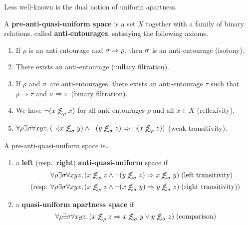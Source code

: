 \documentclass{article}
\def\oapt{\mathrel{\!\not\,\not\lesssim}}
\def\aent#1{\oapt_{#1}}
\let\implies\Rightarrow
\begin{document}
Less well-known is the dual notion of uniform apartness.

\begin{defn}
  A \textbf{pre-anti-quasi-uniform space} is a set $X$ together with a family of binary relations, called \textbf{anti-entourages}, satisfying the following axioms.
  \begin{enumerate}
  \item If $\rho$ is an anti-entourage and $\si\implies\rho$, then $\sigma$ is an anti-entourage (isotony).
  \item There exists an anti-entourage (nullary filtration).
  \item If $\rho$ and $\sigma$ are anti-entourages, there exists an anti-entourage $\tau$ such that $\rho\implies\tau$ and $\si\implies\tau$ (binary filtration).
  \item We have $\neg(x\aent\rho x)$ for all anti-entourages $\rho$ and all $x\in X$ (reflexivity).
  \item $\forall \rho \exists \si \forall xyz, (\neg(x\aent\si y) \land \neg(y\aent\si z) \implies \neg(x\aent\rho z))$ (weak transitivity).
  \end{enumerate}
  A pre-anti-quasi-uniform space is\dots
  \begin{enumerate}[resume]
  \item a \textbf{left} (resp.\ \textbf{right}) \textbf{anti-quasi-uniform} space if
    \begin{align*}
    &\forall \rho \exists \si \forall xyz, (x\aent\rho z \land \neg(y\aent\si z) \implies x\aent\si y) \;\text{(left transitivity)}\\
    \text{(resp. } &\forall \rho \exists \si \forall xyz, (x\aent\rho z \land \neg(x\aent\si y) \implies y\aent\si z)\;\text{(right transitivity))}
    \end{align*}
  \item a \textbf{quasi-uniform apartness space} if
    \[ \forall \rho \exists \si \forall xyz, (x\aent\rho z \implies x\aent\si y \lor y\aent\si z) \;\text{(comparison)}\]

\end{enumerate}
\end{defn}
\end{document}
